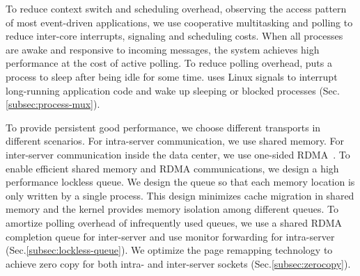 To reduce context switch and scheduling overhead, observing the access pattern of most event-driven applications, we use cooperative multitasking and polling to reduce inter-core interrupts, signaling and scheduling costs. When all processes are awake and responsive to incoming messages, the system achieves high performance at the cost of active polling. To reduce polling overhead, \sys puts a process to sleep after being idle for some time. \sys uses Linux signals to interrupt long-running application code and wake up sleeping or blocked processes (Sec.\ref{subsec:process-mux}). 




 To provide persistent good performance, we choose different transports in different scenarios. For intra-server communication, we use shared memory. For inter-server communication inside the data center, we use one-sided RDMA~\cite{mitchell2013using,kaminsky2016design}. To enable efficient shared memory and RDMA communications, we design a high performance lockless queue. We design the queue so that each memory location is only written by a single process. This design minimizes cache migration in shared memory and the kernel provides memory isolation among different queues. To amortize polling overhead of infrequently used queues, we use a shared RDMA completion queue for inter-server and use monitor forwarding for intra-server (Sec.\ref{subsec:lockless-queue}). We optimize the page remapping technology to achieve zero copy for both intra- and inter-server sockets (Sec.\ref{subsec:zerocopy}).

